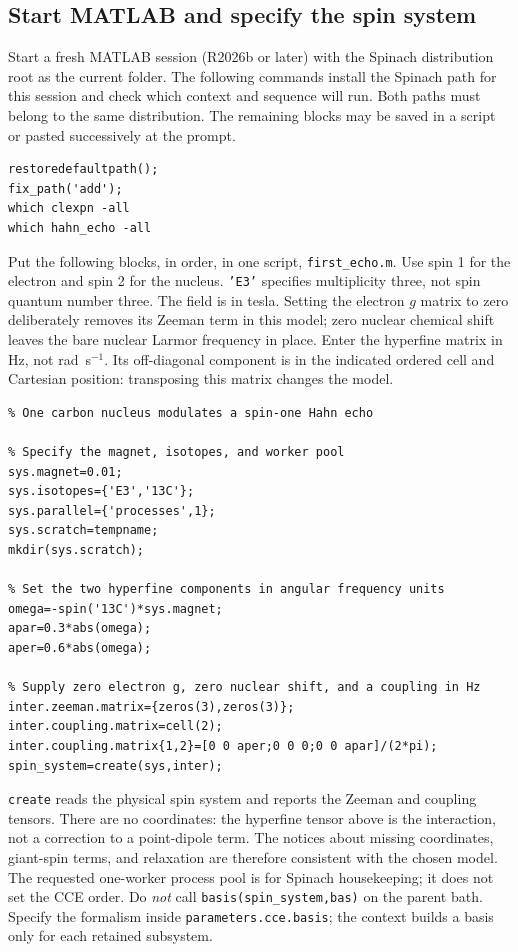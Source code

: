 \documentclass[11pt,a4paper]{article}
\newcommand{\code}[1]{\texttt{#1}}
\begin{document}
\subsection{Start MATLAB and specify the spin system}
Start a fresh MATLAB session (R2026b or later) with the Spinach distribution root as the current folder. The following commands install the Spinach path for this session and check which context and sequence will run. Both paths must belong to the same distribution. The remaining blocks may be saved in a script or pasted successively at the prompt.
\begin{lstlisting}
restoredefaultpath();
fix_path('add');
which clexpn -all
which hahn_echo -all
\end{lstlisting}

Put the following blocks, in order, in one script, \code{first\_echo.m}. Use spin 1 for the electron and spin 2 for the nucleus. \code{'E3'} specifies multiplicity three, not spin quantum number three. The field is in tesla. Setting the electron $g$ matrix to zero deliberately removes its Zeeman term in this model; zero nuclear chemical shift leaves the bare nuclear Larmor frequency in place. Enter the hyperfine matrix in Hz, not rad~s$^{-1}$. Its off-diagonal component is in the indicated ordered cell and Cartesian position: transposing this matrix changes the model.
\begin{lstlisting}
% One carbon nucleus modulates a spin-one Hahn echo

% Specify the magnet, isotopes, and worker pool
sys.magnet=0.01;
sys.isotopes={'E3','13C'};
sys.parallel={'processes',1};
sys.scratch=tempname;
mkdir(sys.scratch);

% Set the two hyperfine components in angular frequency units
omega=-spin('13C')*sys.magnet;
apar=0.3*abs(omega);
aper=0.6*abs(omega);

% Supply zero electron g, zero nuclear shift, and a coupling in Hz
inter.zeeman.matrix={zeros(3),zeros(3)};
inter.coupling.matrix=cell(2);
inter.coupling.matrix{1,2}=[0 0 aper;0 0 0;0 0 apar]/(2*pi);
spin_system=create(sys,inter);
\end{lstlisting}

\code{create} reads the physical spin system and reports the Zeeman and coupling tensors. There are no coordinates: the hyperfine tensor above is the interaction, not a correction to a point-dipole term. The notices about missing coordinates, giant-spin terms, and relaxation are therefore consistent with the chosen model. The requested one-worker process pool is for Spinach housekeeping; it does not set the CCE order. Do \emph{not} call \code{basis(spin\_system,bas)} on the parent bath. Specify the formalism inside \code{parameters.cce.basis}; the context builds a basis only for each retained subsystem.
\end{document}
